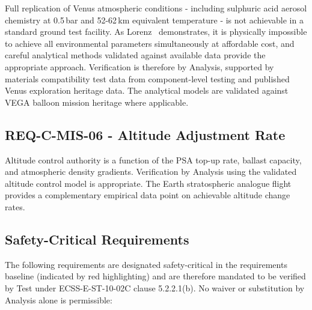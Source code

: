 Full replication of Venus atmospheric conditions - including sulphuric acid aerosol chemistry at 0.5\,bar and 52-62\,km equivalent temperature - is not achievable in a standard ground test facility. As Lorenz~\cite{Lorenz2018} demonstrates, it is physically impossible to achieve all environmental parameters simultaneously at affordable cost, and careful analytical methods validated against available data provide the appropriate approach. Verification is therefore by Analysis, supported by materials compatibility test data from component-level testing and published Venus exploration heritage data. The analytical models are validated against VEGA balloon mission heritage where applicable.

\subsection{REQ-C-MIS-06 - Altitude Adjustment Rate}

Altitude control authority is a function of the PSA top-up rate, ballast capacity, and atmospheric density gradients. Verification by Analysis using the validated altitude control model is appropriate. The Earth stratospheric analogue flight provides a complementary empirical data point on achievable altitude change rates.

\subsection{Safety-Critical Requirements}

The following requirements are designated safety-critical in the requirements baseline (indicated by red highlighting) and are therefore mandated to be verified by Test under ECSS-E-ST-10-02C clause 5.2.2.1(b). No waiver or substitution by Analysis alone is permissible:

